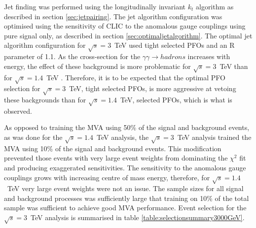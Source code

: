 Jet finding was performed using the longitudinally invariant $k_{t}$ algorithm as described in section \ref{sec:jetpairing}.  The jet algorithm configuration was optimised using the sensitivity of CLIC to the anomalous gauge couplings using pure signal only, as described in section \ref{sec:optimaljetalgorithm}.  The optimal jet algorithm configuration for $\sqrt{s}=3$~TeV used tight selected PFOs and an R parameter of 1.1.  As the cross-section for the $\gamma\gamma \rightarrow hadrons$ increases with energy, the effect of these background is more problematic for $\sqrt{s}=3$~TeV than for $\sqrt{s}=1.4$~TeV \cite{arXiv:1209.4039}.  Therefore, it is to be expected that the optimal PFO selection for $\sqrt{s}=3$~TeV, tight selected PFOs, is more aggressive at vetoing these backgrounds than for $\sqrt{s}=1.4$~TeV, selected PFOs, which is what is observed.  

As opposed to training the MVA using 50\% of the signal and background events, as was done for the $\sqrt{s}=1.4$~TeV analysis, the $\sqrt{s}=3$~TeV analysis trained the MVA using 10\% of the signal and background events.  This modification prevented those events with very large event weights from dominating the $\chi^{2}$ fit and producing exaggerated sensitivities.  The sensitivity to the anomalous gauge couplings grows with increasing centre of mass energy, therefore, for $\sqrt{s}=1.4$~TeV very large event weights were not an issue.  The sample sizes for all signal and background processes was sufficiently large that training on 10\% of the total sample was sufficient to achieve good MVA performance.  Event selection for the $\sqrt{s}=3$~TeV analysis is summarised in table \ref{table:selectionsummary3000GeV}.

